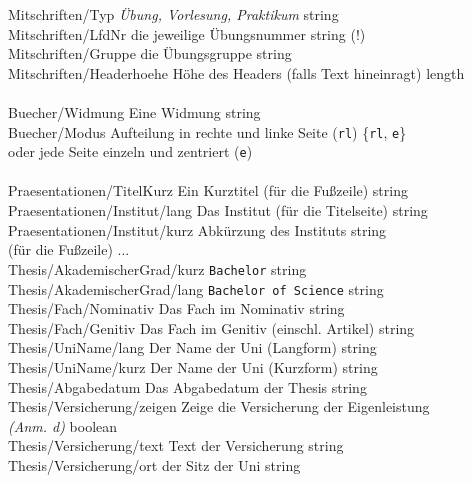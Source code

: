\begin{tabbing}
				Mitschriften/Typ 				\> \zb \emph{Übung, Vorlesung, Praktikum}
																						\> string									\\
				Mitschriften/LfdNr 				\> \zb die jeweilige Übungsnummer		\> string (!)								\\
				Mitschriften/Gruppe 			\> \zb die Übungsgruppe					\> string									\\
				Mitschriften/Headerhoehe		\> Höhe des Headers (falls Text hineinragt)
																						\> length									\\
				\\
				Buecher/Widmung					\> Eine Widmung							\> string									\\
				Buecher/Modus					\> Aufteilung in rechte und linke Seite (\texttt{rl})
																						\> \{\texttt{rl}, \texttt{e}\} 				\\
												\> oder jede Seite einzeln und zentriert (\texttt{e})								\\
				\\
				Praesentationen/TitelKurz		\> Ein Kurztitel (für die Fußzeile)		\> string			\\
				Praesentationen/Institut/lang	\> Das Institut (für die Titelseite)	\> string			\\
				Praesentationen/Institut/kurz	\> Abkürzung des Instituts 				\> string			\\
												\> (für die Fußzeile)					\> \> ...			\\
				Thesis/AkademischerGrad/kurz	\> \zb \texttt{Bachelor}				\> string			\\
				Thesis/AkademischerGrad/lang	\> \zb \texttt{Bachelor of Science}		\> string			\\
				Thesis/Fach/Nominativ			\> Das Fach im Nominativ				\> string			\\
				Thesis/Fach/Genitiv				\> Das Fach im Genitiv (einschl. Artikel) \> string			\\
				Thesis/UniName/lang				\> Der Name der Uni (Langform)			\> string			\\
				Thesis/UniName/kurz				\> Der Name der Uni (Kurzform)			\> string			\\
				Thesis/Abgabedatum				\> Das Abgabedatum der Thesis			\> string			\\
				Thesis/Versicherung/zeigen		\> Zeige die Versicherung der Eigenleistung					\\
												\> \emph{(Anm. d)}						\> boolean			\\
				Thesis/Versicherung/text		\> Text der Versicherung 				\> string			\\
				Thesis/Versicherung/ort			\> \idr der Sitz der Uni 				\> string
			\end{tabbing}
